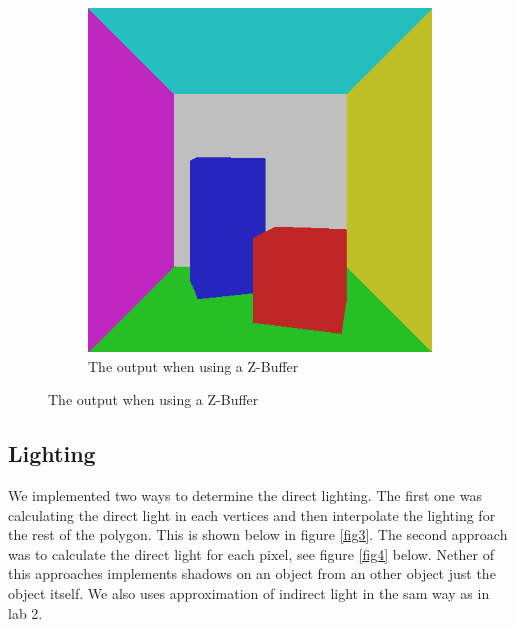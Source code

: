 \documentclass[a4paper,11pt]{article}
\begin{document}
\begin{figure}[h!]
\begin{subfigure}[h!]{0.4\linewidth}
		\includegraphics[width=\linewidth]{screenshot2.png}
		\caption{The output when using a Z-Buffer}
		\label{fig2}
	\end{subfigure}
\end{figure}

\clearpage
\subsection{Lighting}
We implemented two ways to determine the direct lighting. The first one was calculating the direct light in each vertices and then interpolate the lighting for the rest of the polygon. This is shown below in figure \ref{fig3}. The second approach was to calculate the direct light for each pixel, see figure \ref{fig4} below. Nether of this approaches implements shadows on an object from an other object just the object itself. We also uses approximation of indirect light in the sam way as in lab 2.
\end{document}
